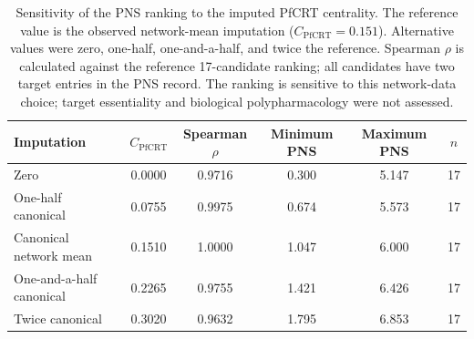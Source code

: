 \begin{table}[ht!]
\centering
\caption{Sensitivity of the PNS ranking to the imputed PfCRT centrality. The reference value is the observed network-mean imputation ($C_{\mathrm{PfCRT}}=\num{0.151}$). Alternative values were zero, one-half, one-and-a-half, and twice the reference. Spearman $\rho$ is calculated against the reference 17-candidate ranking; all candidates have two target entries in the PNS record. The ranking is sensitive to this network-data choice; target essentiality and biological polypharmacology were not assessed.}
\label{tab:s_pns_sensitivity}
\scriptsize
\begin{tabular}{l S[table-format=1.4] S[table-format=1.4] S[table-format=1.3] S[table-format=1.3] S[table-format=2.0]}
\toprule
Imputation & {$C_{\mathrm{PfCRT}}$} & {Spearman $\rho$} & {Minimum PNS} & {Maximum PNS} & {$n$} \\
\midrule
Zero & 0.0000 & 0.9716 & 0.300 & 5.147 & 17 \\
One-half canonical & 0.0755 & 0.9975 & 0.674 & 5.573 & 17 \\
Canonical network mean & 0.1510 & 1.0000 & 1.047 & 6.000 & 17 \\
One-and-a-half canonical & 0.2265 & 0.9755 & 1.421 & 6.426 & 17 \\
Twice canonical & 0.3020 & 0.9632 & 1.795 & 6.853 & 17 \\
\bottomrule
\end{tabular}
\end{table}

